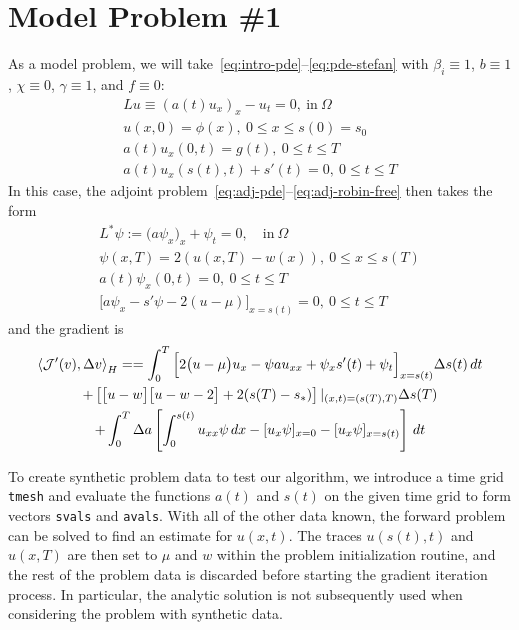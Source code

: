 \documentclass[letterpaper, 10pt]{amsart}
\theoremstyle{definition}
\theoremstyle{remark}
\begin{document}
\section{Model Problem \#1}\label{sec:model-problem-1}
As a model problem, we will take~\eqref{eq:intro-pde}--\eqref{eq:pde-stefan}
with $\beta_i \equiv 1$, $b\equiv 1$, $\chi \equiv 0$, $\gamma \equiv 1$, and
$f\equiv 0$:
\begin{gather}
  Lu \equiv {(a(t) u_x)}_x - u_{t} = 0,~\text{in}~\Omega
  \\
  u(x,0) = \phi (x),~0 \leq x \leq s(0) = s_0
  \\
  a(t) u_x (0,t) = g(t),~0 \leq t \leq T
  \\
  a(t) u_x (s(t),t) + s'(t) = 0,~0 \leq t \leq
  T
\end{gather}
In this case, the adjoint problem~\eqref{eq:adj-pde}--\eqref{eq:adj-robin-free} then takes the form
\begin{gather}
  L^{*} \psi := \big(a \psi_x\big)_x + \psi_t = 0,\quad\text{in}~\Omega
  \\
  \psi(x, T) = 2(u(x, T) - w(x)),~0 \leq x \leq s(T)
  \\
  a(t)\psi_x(0, t) =0,~0 \leq t \leq T
  \\
  \Big[a \psi_x - s'\psi - 2 (u - \mu)\Big]_{x=s(t)}=0, ~0 \leq t \leq T
\end{gather}
and the gradient is
\begin{gather}
  \left\langle \mathcal{J}'(v),\Delta v \right\rangle_H
  = =\int_0^T \Big[
  2\big(u - \mu\big)u_x
  - \psi  a u_{xx}
  + \psi_x s'(t)
  + \psi_t
  \Big]_{x=s(t)} {\Delta s}(t)\,dt \nonumber
  \\
  +
  \left[
    \big[u - w\big]\big[u - w - 2\big] + 2 (s(T) - s_*)
  \right]\vert_{(x,t)=(s(T),T)} {\Delta s}(T)\nonumber
  \\
  + \int_0^T {\Delta a} \left[
    \int_0^{s(t)}  u_{xx} \psi \,dx
    - [u_x \psi]_{x=0}
    - [u_x\psi]_{x=s(t)}
  \right]\,dt\nonumber
\end{gather}

To create synthetic problem data to test our algorithm, we introduce a time grid
\verb+tmesh+ and evaluate the functions $a(t)$ and $s(t)$ on the given time grid
to form vectors \verb+svals+ and \verb+avals+.
With all of the other data known, the forward problem can be solved to find
an estimate for $u(x,t)$.
The traces $u(s(t),t)$ and $u(x,T)$ are then set to $\mu$ and $w$ within the
problem initialization routine, and the rest of the problem data is discarded
before starting the gradient iteration process.
In particular, the analytic solution is not subsequently used when considering
the problem with synthetic data.
\end{document}
